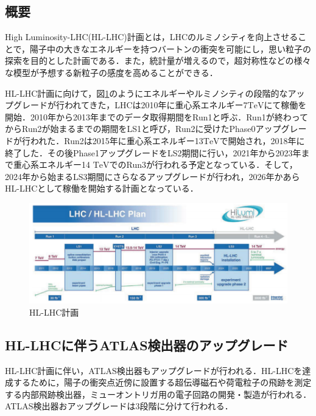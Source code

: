 \subsection{概要}
High Luminosity-LHC(HL-LHC)計画とは，LHCのルミノシティを向上させることで，陽子中の大きなエネルギーを持つバートンの衝突を可能にし，思い粒子の探索を目的とした計画である．また，統計量が増えるので，超対称性などの様々な模型が予想する新粒子の感度を高めることができる．\par
HL-LHC計画に向けて，図\ref{fig:HL-LHC}のようにエネルギーやルミノシティの段階的なアップグレードが行われてきた，LHCは2010年に重心系エネルギー7$\mathrm{TeV}$にて稼働を開始．2010年から2013年までのデータ取得期間をRun1と呼ぶ．Run1が終わってからRun2が始まるまでの期間をLS1と呼び，Run2に受けたPhase0アップグレードが行われた．Run2は2015年に重心系エネルギー13$\mathrm{TeV}$で開始され，2018年に終了した．その後Phase1アップグレードをLS2期間に行い，2021年から2023年まで重心系エネルギー14 $\mathrm{TeV}$でのRun3が行われる予定となっている．そして，2024年から始まるLS3期間にさらなるアップグレードが行われ，2026年かあらHL-LHCとして稼働を開始する計画となっている．

\begin{figure}[h]
  \centering
  \includegraphics[width=12cm]{./figure/HL_LHC.png}
  \caption{HL-LHC計画\cite{Apollinari:2284929}}
  \label{fig:HL-LHC}
\end{figure}


\subsection{HL-LHCに伴うATLAS検出器のアップグレード}
HL-LHC計画に伴い，ATLAS検出器もアップグレードが行われる．HL-LHCを達成するために，陽子の衝突点近傍に設置する超伝導磁石や荷電粒子の飛跡を測定する内部飛跡検出器，ミューオントリガ用の電子回路の開発・製造が行われる．ATLAS検出器おアップグレードは3段階に分けて行われる．

